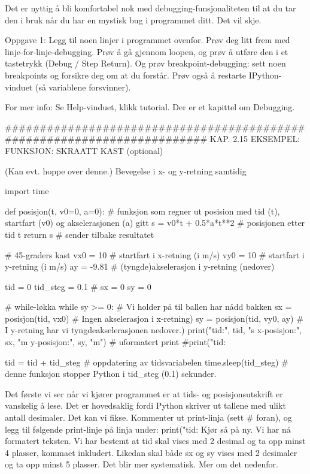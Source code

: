 \documentclass[a4paper,11pt,utf8]{book}
\begin{document}
Det er nyttig å bli komfortabel nok med debugging-funsjonaliteten til at du
tar den i bruk når du har en mystisk bug i programmet ditt.
Det vil skje. 




Oppgave 1: Legg til noen linjer i programmet ovenfor.
Prøv deg litt frem med linje-for-linje-debugging. 
Prøv å gå gjennom loopen, og prøv å utføre den i et tastetrykk (Debug / Step Return). 
Og prøv breakpoint-debugging: sett noen breakpoints og forsikre deg om at du forstår. 
Prøv også å restarte IPython-vinduet (så variablene forsvinner). 


For mer info: Se Help-vinduet, klikk tutorial. Der er et kapittel om Debugging.



######################################################################## 
KAP. 2.15  EKSEMPEL: FUNKSJON: SKRAATT KAST  (optional)

(Kan evt. hoppe over denne.)
Bevegelse i x- og y-retning samtidig


import time

def posisjon(t, v0=0, a=0):    # funksjon som regner ut posision med tid (t), startfart (v0) og akselerasjonen (a) gitt
    s = v0*t + 0.5*a*t**2      # posisjonen etter tid t
    return s                   # sender tilbake resultatet
    

# 45-graders kast
vx0 = 10         # startfart i x-retning (i m/s)
vy0 = 10         # startfart i y-retning (i m/s)
ay = -9.81       # (tyngde)akselerasjon i y-retning (nedover)

tid = 0
tid_steg = 0.1   # 
sx = 0
sy = 0

# while-løkka
while sy >= 0:                    # Vi holder på til ballen har nådd bakken 
    sx = posisjon(tid, vx0)       # Ingen akselerasjon i x-retning) 
    sy = posisjon(tid, vy0, ay)   # I y-retning har vi tyngdeakselerasjonen nedover.)
    print("tid:", tid, "s   x-posisjon:", sx, "m   y-posisjon:", sy, "m")              # uformatert print
    #print("tid: %

    tid = tid + tid_steg          # oppdatering av tidsvariabelen
    time.sleep(tid_steg)          # denne funksjon stopper Python i tid_steg (0.1) sekunder. 


Det første vi ser når vi kjører programmet er at tids- og posisjonsutskrift er vanskelig å lese.
Det er hovedsaklig fordi Python skriver ut tallene med ulikt antall desimaler.
Det kan vi fikse.
Kommenter ut print-linja (sett # foran), og legg til følgende print-linje på linja under:
print("tid: %
Kjør så på ny.
Vi har nå formatert teksten.
Vi har bestemt at tid skal vises med 2 desimal og ta opp minst 4 plasser, kommaet inkludert.
Likedan skal både sx og sy vises med 2 desimaler og ta opp minst 5 plasser.
Det blir mer systematisk. Mer om det nedenfor. 
\end{document}

